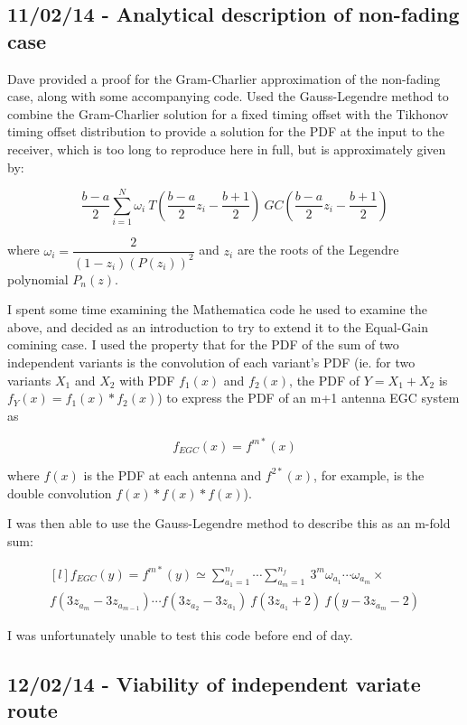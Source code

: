 \subsection{11/02/14 - Analytical description of non-fading case}

Dave provided a proof for the Gram-Charlier approximation of the
non-fading case, along with some accompanying code. Used the
Gauss-Legendre method to combine the Gram-Charlier solution for a fixed
timing offset with the Tikhonov timing offset distribution to provide a
solution for the PDF at the input to the receiver, which is too long to
reproduce here in full, but is approximately given by:

\[
\dfrac{b-a}{2} \sum\limits_{i=1}^N \omega_i \: T \left (\dfrac{b-a}{2} z_i - \dfrac{b+1}{2} \right ) \: GC \left (\dfrac{b-a}{2} z_i - \dfrac{b+1}{2} \right )
\]

where $\omega_i = \dfrac{2}{(1-z_i)(P(z_i))^2}$ and $z_i$ are the roots
of the Legendre polynomial $P_n(z)$.

I spent some time examining the Mathematica code he used to examine the
above, and decided as an introduction to try to extend it to the
Equal-Gain comining case. I used the property that for the PDF of the
sum of two independent variants is the convolution of each variant's PDF
(ie. for two variants $X_1$ and $X_2$ with PDF $f_1(x)$ and $f_2(x)$,
the PDF of $Y=X_1+X_2$ is $f_Y(x) = f_1(x) \ast f_2(x)$) to express the
PDF of an m+1 antenna EGC system as

\[
f_{EGC}(x) = f^{m \ast}(x)
\]

where $f(x)$ is the PDF at each antenna and $f^{2 \ast}(x)$, for
example, is the double convolution $f(x) \ast f(x) \ast f(x)$).

I was then able to use the Gauss-Legendre method to describe this as an
m-fold sum:

\[
\begin{matrix*}[l]
f_{EGC}(y) = f^{m \ast}(y) \simeq \sum\limits_{a_1=1}^{n_f} \cdots \sum\limits_{a_m=1}^{n_f} \: 3^m \omega_{a_1}  \cdots \omega_{a_m} \times \\
f(3 z_{a_m} - 3 z_{a_{m-1}}) \cdots f(3 z_{a_2} - 3 z_{a_1}) \: f(3 z_{a_1} + 2) \: f(y - 3 z_{a_m} - 2) 
\end{matrix*}
\]

I was unfortunately unable to test this code before end of day.

\subsection{12/02/14 - Viability of independent variate route}

